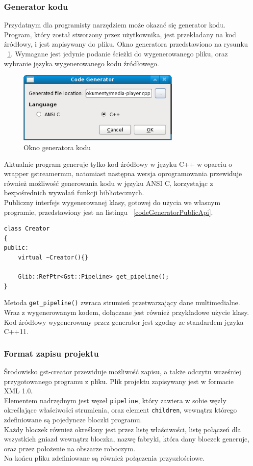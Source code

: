 \documentclass[12pt]{article}
\begin{document}
\subsubsection{Generator kodu}
Przydatnym dla programisty narzędziem może okazać się generator kodu. Program, który został stworzony przez użytkownika, jest przekładany na kod źródłowy, i jest zapisywany do pliku. Okno generatora przedstawiono na rysunku ~\ref{fig:codeGenerator}. Wymagane jest jedynie podanie ścieżki do wygenerowanego pliku, oraz wybranie języka wygenerowanego kodu źródłowego.
\begin{figure}[H]
  \includegraphics[width=80mm]{img/code-generator.png}
  \caption{Okno generatora kodu}
  \label{fig:codeGenerator}
\end{figure}
Aktualnie program generuje tylko kod źródłowy w języku C++ w oparciu o wrapper gstreamermm, natomiast następna wersja oprogramowania przewiduje również możliwość generowania kodu w języku ANSI C, korzystając z bezpośrednich wywołań funkcji bibliotecznych.\\
Publiczny interfejs wygenerowanej klasy, gotowej do użycia we własnym programie, przedstawiony jest na listingu ~\ref{codeGeneratorPublicApi}.
\begin{lstlisting}[caption=Publiczny interfejs klasy stworzonej przez generator kodu, label=codeGeneratorPublicApi]
class Creator
{
public:
	virtual ~Creator(){}

	Glib::RefPtr<Gst::Pipeline> get_pipeline();
}
\end{lstlisting}
Metoda \texttt{get\_pipeline()} zwraca strumień przetwarzający dane multimedialne.\\
Wraz z wygenerowanym kodem, dołączane jest również przykładowe użycie klasy.\\
Kod źródłowy wygenerowany przez generator jest zgodny ze standardem języka C++11.
\subsubsection{Format zapisu projektu}
Środowisko gst-creator przewiduje możliwość zapisu, a także odczytu wcześniej przygotowanego programu z pliku. Plik projektu zapisywany jest w formacie XML 1.0.\\
Elementem nadrzędnym jest węzeł \texttt{pipeline}, który zawiera w sobie węzły określające właściwości strumienia, oraz element \texttt{children}, wewnątrz którego zdefiniowane są pojedyncze bloczki programu. \\
Każdy bloczek również określony jest przez listę właściwości, listę połączeń dla wszystkich gniazd wewnątrz bloczka, nazwę fabryki, która dany bloczek generuje, oraz przez położenie na obszarze roboczym. \\
Na końcu pliku zdefiniowane są również połączenia przyszłościowe.
\cleardoublepage
\end{document}
